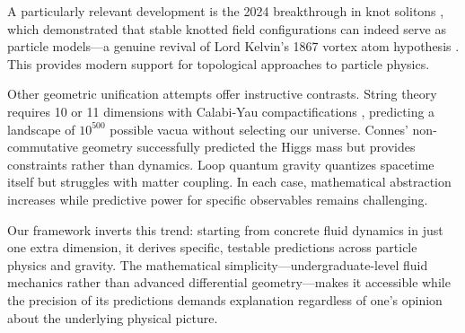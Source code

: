 A particularly relevant development is the 2024 breakthrough in knot solitons \cite{eto2024knots}, which demonstrated that stable knotted field configurations can indeed serve as particle models---a genuine revival of Lord Kelvin's 1867 vortex atom hypothesis \cite{thomson1867vortex}. This provides modern support for topological approaches to particle physics.

Other geometric unification attempts offer instructive contrasts. String theory requires 10 or 11 dimensions with Calabi-Yau compactifications \cite{candelas1985vacuum}, predicting a landscape of $10^{500}$ possible vacua without selecting our universe. Connes' non-commutative geometry \cite{chamseddine2007gravity} successfully predicted the Higgs mass but provides constraints rather than dynamics. Loop quantum gravity \cite{ashtekar1986new} quantizes spacetime itself but struggles with matter coupling. In each case, mathematical abstraction increases while predictive power for specific observables remains challenging.

Our framework inverts this trend: starting from concrete fluid dynamics in just one extra dimension, it derives specific, testable predictions across particle physics and gravity. The mathematical simplicity---undergraduate-level fluid mechanics rather than advanced differential geometry---makes it accessible while the precision of its predictions demands explanation regardless of one's opinion about the underlying physical picture.
